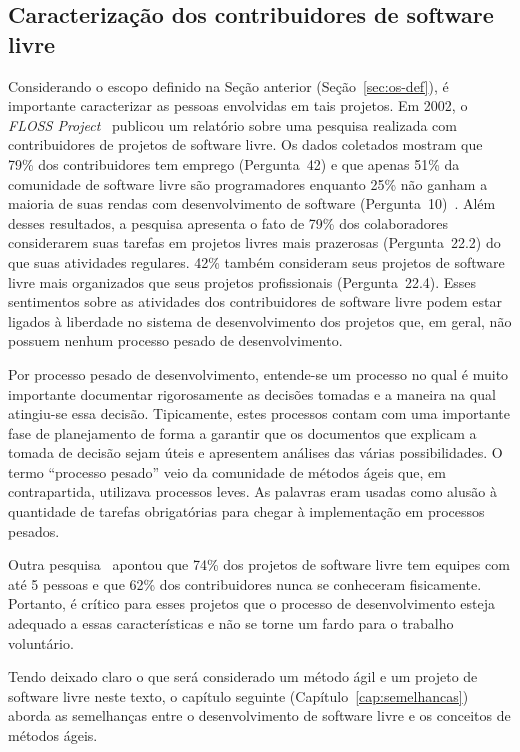 \subsection{Caracterização dos contribuidores de software livre}
\label{subsec:caracterizacao}

Considerando o escopo definido na Seção anterior
(Seção~\ref{sec:os-def}), é importante caracterizar as pessoas
envolvidas em tais projetos. Em 2002, o \emph{FLOSS
  Project}~\cite{FlossProject} publicou um relatório sobre uma
pesquisa realizada com contribuidores de projetos de software
livre. Os dados coletados mostram que 79\% dos contribuidores tem
emprego (Pergunta~42) e que apenas 51\% da comunidade de software
livre são programadores enquanto 25\% não ganham a maioria de suas
rendas com desenvolvimento de software
(Pergunta~10)~\cite{FlossStats}. Além desses resultados, a pesquisa
apresenta o fato de 79\% dos colaboradores considerarem suas tarefas
em projetos livres mais prazerosas (Pergunta~22.2) do que suas
atividades regulares. 42\% também consideram seus projetos de software
livre mais organizados que seus projetos profissionais
(Pergunta~22.4).  Esses sentimentos sobre as atividades dos
contribuidores de software livre podem estar ligados à liberdade no
sistema de desenvolvimento dos projetos que, em geral, não possuem
nenhum processo pesado de desenvolvimento.

Por processo pesado de desenvolvimento, entende-se um processo no qual
é muito importante documentar rigorosamente as decisões tomadas e a
maneira na qual atingiu-se essa decisão. Tipicamente, estes processos
contam com uma importante fase de planejamento de forma a garantir que
os documentos que explicam a tomada de decisão sejam úteis e
apresentem análises das várias possibilidades. O termo ``processo
pesado'' veio da comunidade de métodos ágeis que, em contrapartida,
utilizava processos leves. As palavras eram usadas como alusão à
quantidade de tarefas obrigatórias para chegar à implementação em
processos pesados.

Outra pesquisa~\cite{Reis2003} apontou que 74\% dos projetos de
software livre tem equipes com até 5 pessoas e que 62\% dos
contribuidores nunca se conheceram fisicamente. Portanto, é crítico
para esses projetos que o processo de desenvolvimento esteja adequado
a essas características e não se torne um fardo para o trabalho
voluntário.

Tendo deixado claro o que será considerado um método ágil e um projeto
de software livre neste texto, o capítulo seguinte
(Capítulo~\ref{cap:semelhancas}) aborda as semelhanças entre o
desenvolvimento de software livre e os conceitos de métodos ágeis.
